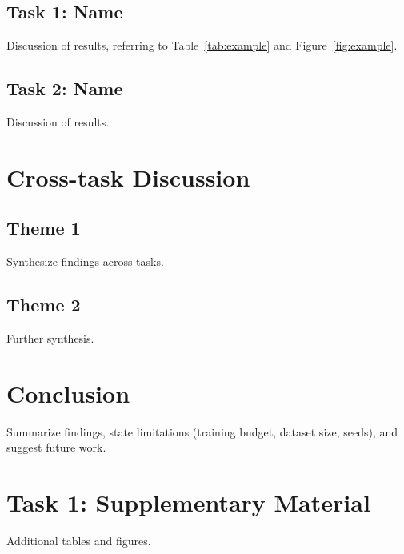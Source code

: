 \documentclass{article}
\begin{document}
\subsection{Task 1: Name}
\label{sec:task1-results}

Discussion of results, referring to Table~\ref{tab:example} and Figure~\ref{fig:example}.


\subsection{Task 2: Name}
\label{sec:task2-results}

Discussion of results.

\FloatBarrier

\section{Cross-task Discussion}

\subsection{Theme 1}
Synthesize findings across tasks.

\subsection{Theme 2}
Further synthesis.

\section{Conclusion}
Summarize findings, state limitations (training budget, dataset size, seeds), and suggest future work.




\newpage
\appendix

\section{Task 1: Supplementary Material}
\label{app:task1}

Additional tables and figures.

\FloatBarrier
\end{document}
